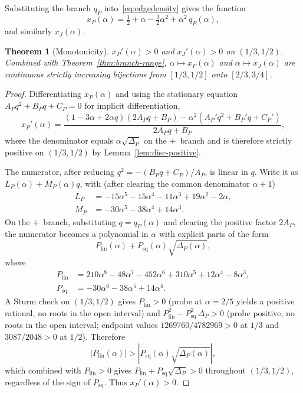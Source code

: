 \documentclass[11pt]{amsart}
\newtheorem{theorem}{Theorem}[section]
\theoremstyle{definition}
\begin{document}
Substituting the branch $q_P$ into~\eqref{eq:edgedensity} gives the function
\[
   x_P(\alpha) = \tfrac12 + \alpha - \tfrac32\alpha^2 + \alpha^2\, q_P(\alpha),
\]
and similarly $x_J(\alpha)$.

\begin{theorem}[Monotonicity]
\label{thm:monotonicity}
$x_P'(\alpha) > 0$ and $x_J'(\alpha) > 0$ on $(1/3,1/2)$.  Combined with
Theorem~\ref{thm:branch-range}, $\alpha\mapsto x_P(\alpha)$ and
$\alpha\mapsto x_J(\alpha)$ are continuous strictly increasing bijections
from $[1/3,1/2]$ onto $[2/3,3/4]$.
\end{theorem}

\begin{proof}
Differentiating $x_P(\alpha)$ and using the stationary equation
$A_P q^2 + B_P q + C_P=0$ for implicit differentiation,
\[
   x_P'(\alpha)
   = \frac{(1-3\alpha+2\alpha q)(2A_P q + B_P) - \alpha^2(A_P' q^2 + B_P' q + C_P')}
          {2 A_P q + B_P},
\]
where the denominator equals $\alpha\sqrt{\Delta_P}$ on the $+$~branch and
is therefore strictly positive on $(1/3,1/2)$ by Lemma~\ref{lem:disc-positive}.

The numerator, after reducing $q^2 = -(B_P q + C_P)/A_P$, is linear in $q$.
Write it as $L_P(\alpha) + M_P(\alpha) q$, with (after clearing the common
denominator $\alpha+1$)
\begin{align*}
L_P &= -15\alpha^5 - 15\alpha^4 - 11\alpha^3 + 19\alpha^2 - 2\alpha,
\\
M_P &= -30\alpha^5 - 38\alpha^4 + 14\alpha^3.
\end{align*}
On the $+$~branch, substituting $q = q_P(\alpha)$ and clearing the positive
factor $2A_P$, the numerator becomes a polynomial in $\alpha$ with explicit
parts of the form
\[
   P_{\mathrm{lin}}(\alpha) + P_{\mathrm{sq}}(\alpha)\sqrt{\Delta_P(\alpha)},
\]
where
\begin{align*}
P_{\mathrm{lin}} &= 210\alpha^8 - 48\alpha^7 - 452\alpha^6 + 310\alpha^5 + 12\alpha^4 - 8\alpha^3,
\\
P_{\mathrm{sq}}  &= -30\alpha^6 - 38\alpha^5 + 14\alpha^4.
\end{align*}
A Sturm check on $(1/3,1/2)$ gives
$P_{\mathrm{lin}}>0$ (probe at $\alpha=2/5$ yields a positive rational, no roots
in the open interval) and
$P_{\mathrm{lin}}^2 - P_{\mathrm{sq}}^2\,\Delta_P > 0$ (probe positive, no roots
in the open interval; endpoint values $1269760/4782969 > 0$ at $1/3$ and
$3087/2048 > 0$ at $1/2$).  Therefore
\[
   |P_{\mathrm{lin}}(\alpha)| > |P_{\mathrm{sq}}(\alpha)\sqrt{\Delta_P(\alpha)}|,
\]
which combined with $P_{\mathrm{lin}} > 0$ gives $P_{\mathrm{lin}} +
P_{\mathrm{sq}}\sqrt{\Delta_P} > 0$ throughout $(1/3,1/2)$, regardless of the
sign of $P_{\mathrm{sq}}$.  Thus $x_P'(\alpha) > 0$.


\end{proof}
\end{document}
